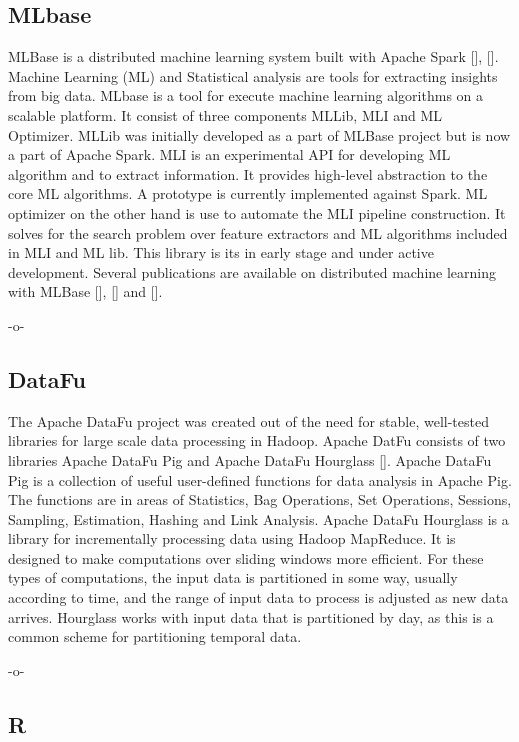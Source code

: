 \subsection{MLbase}
    
MLBase is a distributed machine learning system built with Apache
Spark [\cite{www-spark}], [\cite{www-mlbase}].  Machine Learning (ML) and
Statistical analysis are tools for extracting insights from big data.
MLbase is a tool for execute machine learning algorithms on a scalable
platform. It consist of three components MLLib, MLI and ML
Optimizer. MLLib was initially developed as a part of MLBase project
but is now a part of Apache Spark. MLI is an experimental API for
developing ML algorithm and to extract information. It provides
high-level abstraction to the core ML algorithms. A prototype is
currently implemented against Spark. ML optimizer on the other hand is
use to automate the MLI pipeline construction. It solves for the
search problem over feature extractors and ML algorithms included in
MLI and ML lib. This library is its in early stage and under active
development. Several publications are available on distributed machine
learning with MLBase [\cite{mlbasepub1}], [\cite{mlbasepub2}]
and [\cite{mlbasepub3}].

    -o-


\subsection{DataFu}

The Apache DataFu project was created out of the need for stable,
well-tested libraries for large scale data processing in Hadoop.
Apache DatFu consists of two libraries Apache DataFu Pig and Apache
DataFu Hourglass [\cite{www-DataFu}]. Apache DataFu Pig is a collection
of useful user-defined functions for data analysis in Apache Pig. The
functions are in areas of Statistics, Bag Operations, Set Operations,
Sessions, Sampling, Estimation, Hashing and Link Analysis.  Apache
DataFu Hourglass is a library for incrementally processing data using
Hadoop MapReduce. It is designed to make computations over sliding
windows more efficient. For these types of computations, the input
data is partitioned in some way, usually according to time, and the
range of input data to process is adjusted as new data arrives.
Hourglass works with input data that is partitioned by day, as this is
a common scheme for partitioning temporal data.

   -o-

\subsection{R}

